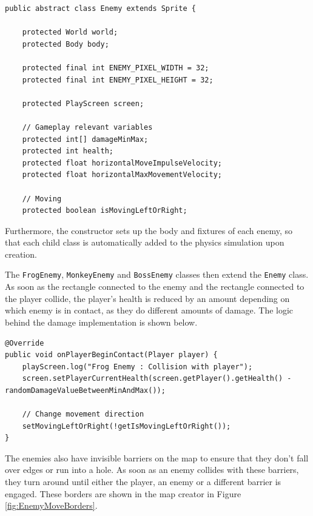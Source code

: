 \documentclass[12p]{article}
\begin{document}
\begin{verbatim}
public abstract class Enemy extends Sprite {

    protected World world;
    protected Body body;

    protected final int ENEMY_PIXEL_WIDTH = 32;
    protected final int ENEMY_PIXEL_HEIGHT = 32;

    protected PlayScreen screen;

    // Gameplay relevant variables
    protected int[] damageMinMax;
    protected int health;
    protected float horizontalMoveImpulseVelocity;
    protected float horizontalMaxMovementVelocity;

    // Moving
    protected boolean isMovingLeftOrRight;
\end{verbatim}

Furthermore, the constructor sets up the body and fixtures of each enemy, so that each child class is automatically added to the physics simulation upon creation.

The \texttt{FrogEnemy}, \texttt{MonkeyEnemy} and \texttt{BossEnemy} classes then extend the \texttt{Enemy} class. As soon as the rectangle connected to the enemy and the rectangle connected to the player collide, the player’s health is reduced by an amount depending on which enemy is in contact, as they do different amounts of damage. The logic behind the damage implementation is shown below.

\begin{verbatim}
@Override
public void onPlayerBeginContact(Player player) {
    playScreen.log("Frog Enemy : Collision with player");
    screen.setPlayerCurrentHealth(screen.getPlayer().getHealth() - randomDamageValueBetweenMinAndMax());

    // Change movement direction
    setMovingLeftOrRight(!getIsMovingLeftOrRight());
}
\end{verbatim}

The enemies also have invisible barriers on the map to ensure that they don’t fall over edges or run into a hole. As soon as an enemy collides with these barriers, they turn around until either the player, an enemy or a different barrier is engaged. These borders are shown in the map creator in Figure \ref{fig:EnemyMoveBorders}.
\end{document}
